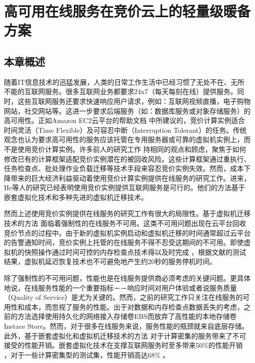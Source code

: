 \chapter{高可用在线服务在竞价云上的轻量级暖备方案}
\label{cha:gemini}

\section{本章概述}
\label{sec:gemini_intro}
随着IT信息技术的迅猛发展，人类的日常工作生活中已经习惯了无处不在、无所不能的互联网服务。很多互联网业务都要求24x7（每天每刻在线）提供服务。同时，这些互联网服务还要求快速响应用户请求，例如：互联网视频直播，电子购物网站，社交网站等。这进一步要求后端服务（如：数据库服务或对象存储服务）的高可用性。正如Amazon EC2云平台的帮助文档 \cite{SI:2014} 中所建议的，竞价计算实例适合时间灵活（Time Flexible）及可容忍中断（Interruption Tolerant）的任务。传统观念也认为要求高可用性的服务应该托管在专用服务器或可靠的虚拟机实例上，而不是使用竞价计算实例。许多前人的研究工作 \cite{chohan2010see, Liu:2011:CMC:2170444.2170450, song2012optimal, Yi:2010:RCS:1844768.1845343, Andrzejak:2010:DMC:1906481.1906533} 持相同的观点和顾虑，聚焦于如何修改已有的计算框架适配竞价实例潜在的被回收风险。这些计算框架通过重执行、任务检查点、批处理作业负载迁移等技术手段来容忍竞价实例失效。然而，成本下降带来的巨大经济利益驱动着使用竞价计算实例提供在线服务的研究工作。进来，He等人的研究已经表明使用竞价实例提供互联网服务是可行的。他们的方法基于嵌套虚拟化技术和多种先进的虚拟机迁移技术。

然而上述使用竞价实例提供在线服务的研究工作有很大的局限性。基于虚拟机迁移技术的方法 \cite{He:2015:CCH:2749246.2749275} 面临着强制性的在线服务不可用。这类不可用问题出现在云平台回收竞价节点的过程中。由于新的虚拟机实例启动和虚拟机迁移的时间通常超过云平台的告警通知时间，竞价实例上托管的在线服务不得不忍受这期间的不可用。即使虚拟机的快照操作通过时间可控的内存检查点技术得以及时完成 \cite{Singh:2013:YEG:2482626.2482642}，根据文献\cite{Hines:2009:PBL:1508293.1508301}的测试结果，虚拟机延迟恢复技术也不可避免地产生约20秒的服务停机时间。

除了强制性的不可用问题，性能也是在线服务提供商必须考虑的关键问题。更具体地说，在线服务性能的一个重要指标－－响应时间对用户体验或者说服务质量（Quality of Service）是尤为关键的。然而，之前的研究工作只关注在线服务的可用性和成本，而忽视了服务的性能。出于对数据和内存检查点数据丢失的考虑，之前的方法选择使用持久化的网络接入存储卷EBS而放弃了高性能的本地存储卷Instace Store。然而，对于很多在线服务来说，服务性能的瓶颈就来自底层存储。此外，基于嵌套虚拟化和虚拟机迁移技术的方法 \cite{He:2015:CCH:2749246.2749275} 对于计算密集的服务带来了不可接受的性能开销。嵌套虚拟化技术在支撑互联网服务时至多带来50\%的性能开销 \cite{He:2015:CCH:2749246.2749275}，对于一些计算密集型的测试集，性能开销高达68\% \cite{Williams:2012:XVO:2168836.2168849}。

